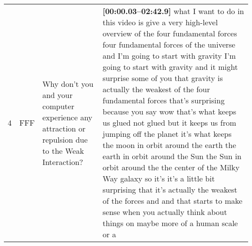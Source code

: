 \documentclass[10pt]{article}
\begin{document}
\begin{tiny}
\begin{longtable}{|r|p{0.375in}|p{1.275in}|p{3.5in}|}
4  &          FFF &                                                                                                                                                                              Why don't you and your computer experience any attraction or repulsion due to the Weak Interaction? &                                                                                                                                                                                                                                                                                                                                                                                                                                                                                                                                                                                                                                                                                                                                                                                                                                                                                                                                                                                                                                                                                                                                                                                                                                                                                                                                                                                                                                                                                                                                                                                                                                                                                                                                                                                                                                                                                                                                                                                                                                                                                                                                                                                                                                                                    \textbf{[00:00.03--02:42.9]} what I want to do in this video is give a very high-level overview of the four fundamental forces four fundamental forces of the universe and I'm going to start with gravity I'm going to start with gravity and it might surprise some of you that gravity is actually the weakest of the four fundamental forces that's surprising because you say wow that's what keeps us glued not glued but it keeps us from jumping off the planet it's what keeps the moon in orbit around the earth the earth in orbit around the Sun the Sun in orbit around the the center of the Milky Way galaxy so it's it's a little bit surprising that it's actually the weakest of the forces and and that starts to make sense when you actually think about things on maybe more of a human scale or a 
\end{longtable}
\end{tiny}
\end{document}
